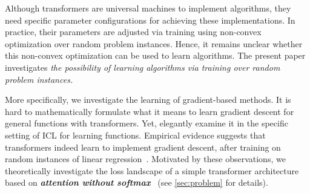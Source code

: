 \documentclass{article}
\newcommand{\emphh}[1]{\textbf{\emph{#1}}}
\begin{document}
Although transformers are universal machines to implement algorithms, they need specific parameter configurations for achieving these implementations. In practice, their parameters are adjusted via training using non-convex optimization over random problem instances. Hence, it remains unclear whether this non-convex optimization can be used to learn algorithms. The present paper investigates \emph{the possibility of learning algorithms via training over random problem instances.}

More specifically, we investigate the learning of gradient-based methods.  It is hard to mathematically formulate what it means to learn gradient descent for general functions with transformers. Yet, \citet{garg2022can} elegantly examine it in the specific setting of ICL for learning functions. Empirical evidence suggests that transformers indeed learn to implement gradient descent, after training on random instances of linear regression~\citep{garg2022can,akyurek2022learning,von2022transformers}. 
Motivated by these observations, we theoretically investigate the loss landscape of a simple transformer architecture based on \emphh{ attention without softmax}~\citep{schlag2021linear,von2022transformers} (see \autoref{sec:problem} for details).
\end{document}
